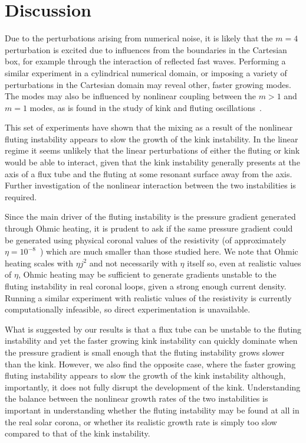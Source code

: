 \section{Discussion}

Due to the perturbations arising from numerical noise, it is likely that the $m=4$ perturbation is excited due to influences from the boundaries in the Cartesian box, for example through the interaction of reflected fast waves. Performing a similar experiment in a cylindrical numerical domain, or imposing a variety of perturbations in the Cartesian domain may reveal other, faster growing modes. The modes may also be influenced by nonlinear coupling between the $m>1$ and $m=1$ modes, as is found in the study of kink and fluting oscillations~\cite{terradasEffectMagneticTwist2018,rudermanNonlinearGenerationFluting2017a}.

This set of experiments have shown that the mixing as a result of the nonlinear fluting instability appears to slow the growth of the kink instability. In the linear regime it seems unlikely that the linear perturbations of either the fluting or kink would be able to interact, given that the kink instability generally presents at the axis of a flux tube and the fluting at some resonant surface away from the axis. Further investigation of the nonlinear interaction between the two instabilities is required.

Since the main driver of the fluting instability is the pressure gradient generated through Ohmic heating, it is prudent to ask if the same pressure gradient could be generated using physical coronal values of the resistivity (of approximately $\eta=10^{-8}$~\cite{craigAnisotropicViscousDissipation2009a}) which are much smaller than those studied here. We note that Ohmic heating scales with $\eta j^2$ and not necessarily with $\eta$ itself so, even at realistic values of $\eta$, Ohmic heating may be sufficient to generate gradients unstable to the fluting instability in real coronal loops, given a strong enough current density. Running a similar experiment with realistic values of the resistivity is currently computationally infeasible, so direct experimentation is unavailable.

What is suggested by our results is that a flux tube can be unstable to the fluting instability and yet the faster growing kink instability can quickly dominate when the pressure gradient is small enough that the fluting instability grows slower than the kink. However, we also find the opposite case, where the faster growing fluting instability appears to slow the growth of the kink instability although, importantly, it does not fully disrupt the development of the kink. Understanding the balance between the nonlinear growth rates of the two instabilities is important in understanding whether the fluting instability may be found at all in the real solar corona, or whether its realistic growth rate is simply too slow compared to that of the kink instability.

